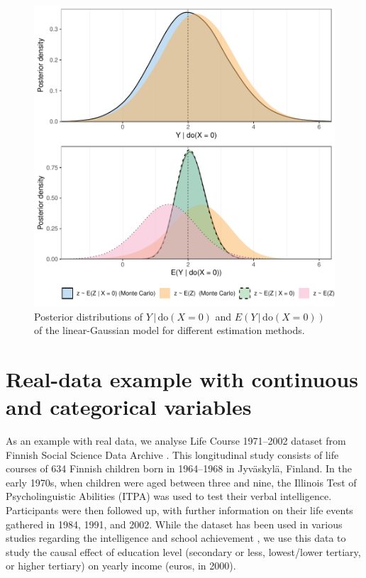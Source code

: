 \documentclass{statsoc}
\newcommand{\+}[1]{\ensuremath{\mathbf{#1}}}
\newcommand{\doo}{\textrm{do}}
\newcommand{\given}{{ \, | \, }}
\begin{document}
\begin{figure}[!ht]
\includegraphics[width=\textwidth]{figures/gaussian_mc.pdf} 
\caption{Posterior distributions of $Y \given  \doo(X = 0)$ and $E(Y \given  \doo(X = 0))$ of the linear-Gaussian model for different estimation methods.}
\label{fig:gaussian-montecarlo}
\end{figure}
\clearpage
\section{Real-data example with continuous and categorical variables}
\label{sec:real-data-example}

As an example with real data, we analyse Life Course 1971--2002 dataset from Finnish Social Science Data Archive \citep{fsd}. This longitudinal study consists of life courses of 634 Finnish children born in 1964--1968 in Jyv\"askyl\"a, Finland. In the early 1970s, when children were aged between three and nine, the Illinois Test of Psycholinguistic Abilities (ITPA) was used to test their verbal intelligence. Participants were then followed up, with further information on their life events gathered in 1984, 1991, and 2002. While the dataset has been used in various studies regarding the intelligence and school achievement \citep[see, e.g.,][]{Kuusinen1988}, we use this data to study the causal effect of education level (secondary or less, lowest/lower tertiary, or higher tertiary) on yearly income (euros, in 2000).
\end{document}
